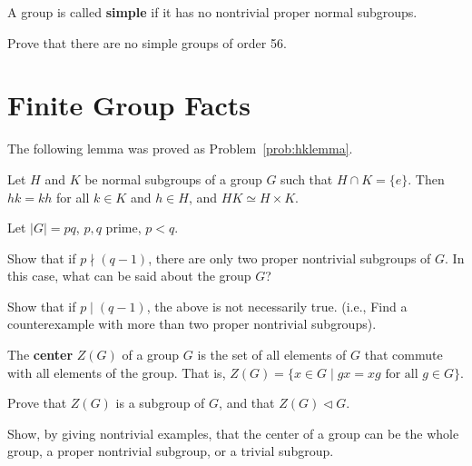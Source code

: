 \begin{definition}
 A group is called \textbf{simple} if it has no nontrivial proper normal subgroups.
\end{definition}

\begin{problem}
Prove that there are no simple groups of order 56.
\end{problem}

\section{Finite Group Facts}

The following lemma was proved as Problem~\ref{prob:hklemma}.

\begin{lemma}
 Let $H$ and $K$ be normal subgroups of a group $G$ such that $H\cap K = \{e\}$. Then $hk = kh$ for all $k\in K$ and $h\in H$, and $HK \simeq H\times K$.
\end{lemma}

\begin{problem}
Let $\lvert G \rvert = pq$, $p,q$ prime, $p<q$.
\begin{problemparts}
 \item Show that if $p \nmid (q-1)$, there are only two proper nontrivial subgroups of $G$.  In this case, what can be said about the group $G$?
 \item Show that if $p \mid (q-1)$, the above is not necessarily true. (i.e., Find a counterexample with more than two proper nontrivial subgroups).
\end{problemparts}
\end{problem}

\begin{definition}
 The \textbf{center} $Z(G)$ of a group $G$ is the set of all elements of $G$ that commute with all elements of the group.  That is, $Z(G) = \{ x \in G \mid gx = xg \mbox{ for all } g \in G \}$.
\end{definition}

\begin{problem}
Prove that $Z(G)$ is a subgroup of $G$, and that $Z(G)\lhd G$.
\end{problem}

\begin{problem}
Show, by giving nontrivial examples, that the center of a group can be the whole group, a proper nontrivial subgroup, or a trivial subgroup.
\begin{annotation}
\end{annotation}
\end{problem}

